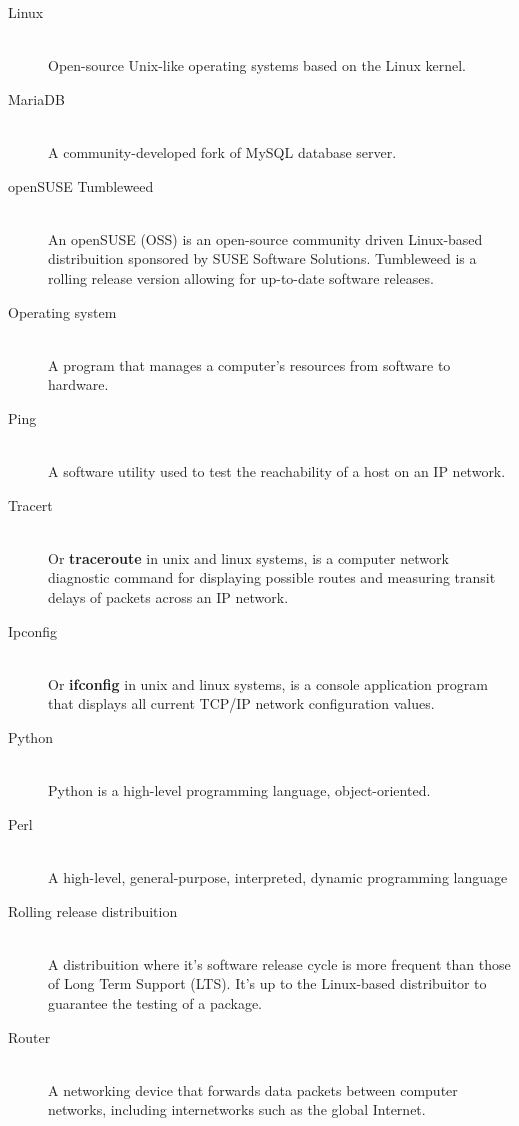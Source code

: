 \documentclass[11pt,a4paper]{report}
\begin{document}
\begin{description}
        \item[Linux] \hfill \\
            Open-source Unix-like operating systems based on the Linux kernel.
        \item[MariaDB] \hfill \\
            A community-developed fork of MySQL database server.
        \item[openSUSE Tumbleweed] \hfill \\
            An openSUSE (OSS) is an open-source community driven Linux-based distribuition sponsored by SUSE Software Solutions. Tumbleweed is a rolling release version allowing for up-to-date software releases.
        \item[Operating system] \hfill \\
            A program that manages a computer's resources from software to hardware.
        \item[Ping] \hfill \\
             A software utility used to test the reachability of a host on an IP network.
        \item[Tracert] \hfill \\
            Or \textbf{traceroute} in unix and linux systems, is a computer network diagnostic command for displaying possible routes and measuring transit delays of packets across an IP network.
        \item[Ipconfig] \hfill \\
            Or \textbf{ifconfig} in unix and linux systems, is a console application program that displays all current TCP/IP network configuration values.
        \item[Python] \hfill \\
            Python is a high-level programming language, object-oriented.
        \item[Perl] \hfill \\
            A high-level, general-purpose, interpreted, dynamic programming language
        \item[Rolling release distribuition] \hfill \\
            A distribuition where it's software release cycle is more frequent than those of Long Term Support (LTS). It's up to the Linux-based distribuitor to guarantee the testing of a package.
        \item[Router] \hfill \\
            A networking device that forwards data packets between computer networks, including internetworks such as the global Internet.

\end{description}
\end{document}
